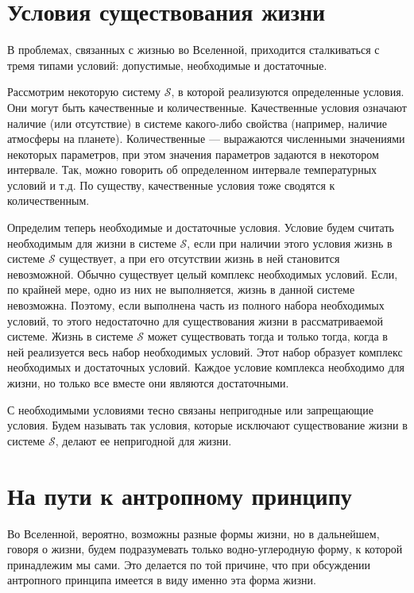 \chapter{Условия существования жизни} \label{chapt2}

В проблемах, связанных с жизнью во Вселенной, приходится сталкиваться с тремя типами условий: допустимые, необходимые и достаточные. 


Рассмотрим некоторую систему $\mathcal{S}$, в которой реализуются определенные условия. Они могут быть качественные и количественные. Качественные условия означают наличие (или отсутствие) в системе какого-либо свойства (например, наличие атмосферы на планете). Количественные --- выражаются численными значениями некоторых параметров, при этом значения параметров задаются в некотором интервале. Так, можно говорить об определенном интервале температурных условий и т.д. По существу, качественные условия тоже сводятся к количественным. 


Определим теперь необходимые и достаточные условия. Условие будем считать необходимым для жизни в системе $\mathcal{S}$, если при наличии этого условия жизнь в системе $\mathcal{S}$ существует, а при его отсутствии жизнь в ней становится невозможной. Обычно существует целый комплекс необходимых условий. Если, по крайней мере, одно из них не выполняется, жизнь в данной системе невозможна. Поэтому, если выполнена часть из полного набора необходимых условий, то этого недостаточно для существования жизни в рассматриваемой системе. Жизнь в системе $\mathcal{S}$ может существовать тогда и только тогда, когда в ней реализуется весь набор необходимых условий. Этот набор образует комплекс необходимых и достаточных условий. Каждое условие комплекса необходимо для жизни, но только все вместе они являются достаточными. 


С необходимыми условиями тесно связаны непригодные или запрещающие условия. Будем называть так условия, которые исключают существование жизни в системе $\mathcal{S}$, делают ее непригодной для жизни. 



\clearpage

\chapter{На пути к антропному принципу} \label{chapt3}

Во Вселенной, вероятно, возможны разные формы жизни, но в дальнейшем, говоря о жизни, будем  подразумевать только водно-углеродную форму, к которой принадлежим мы сами. Это делается по той причине, что при обсуждении антропного принципа имеется в виду именно эта форма жизни.


